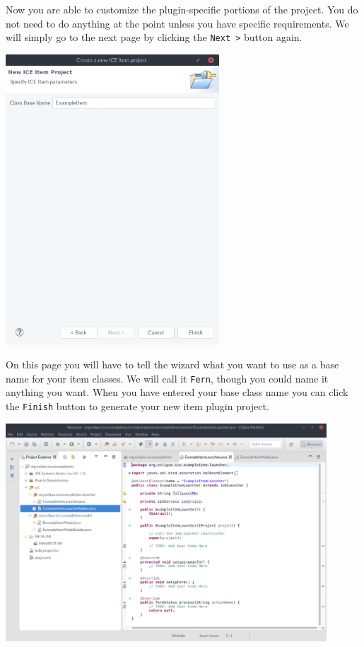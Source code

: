 \documentclass{article} \usepackage{graphicx} \usepackage{hyperref}
\begin{document}
Now you are able to customize the plugin-specific portions of the project.  You
do not need to do anything at the point unless you have specific requirements.
We will simply go to the next page by clicking the \texttt{Next >} button
again.

\begin{center} \includegraphics[width=8cm]{images/5} \end{center}

On this page you will have to tell the wizard what you want to use as a base
name for your item classes.  We will call it \texttt{Fern}, though you could
name it anything you want.  When you have entered your base class name you can
click the \texttt{Finish} button to generate your new item plugin project.

\begin{center} \includegraphics[width=12cm]{images/6} \end{center}
\end{document}
